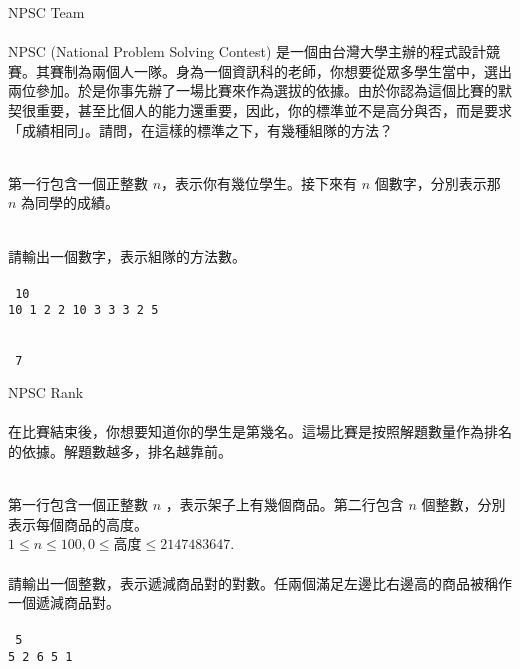 \documentclass{article}
\begin{document}

{\huge NPSC Team}\\

\\
    NPSC (National Problem Solving Contest) 是一個由台灣大學主辦的程式設計競賽。其賽制為兩個人一隊。身為一個資訊科的老師，你想要從眾多學生當中，選出兩位參加。於是你事先辦了一場比賽來作為選拔的依據。由於你認為這個比賽的默契很重要，甚至比個人的能力還重要，因此，你的標準並不是高分與否，而是要求「成績相同」。請問，在這樣的標準之下，有幾種組隊的方法？

\\
    第一行包含一個正整數 $n$，表示你有幾位學生。接下來有 $n$ 個數字，分別表示那 $n$ 為同學的成績。

\\
    請輸出一個數字，表示組隊的方法數。\\

\\
    \texttt{
        10\\
        10 1 2 2 10 3 3 3 2 5\\
    }


\\
    \texttt{
        7\\
    }

\newpage



{\huge NPSC Rank}\\

\\
    在比賽結束後，你想要知道你的學生是第幾名。這場比賽是按照解題數量作為排名的依據。解題數越多，排名越靠前。

\\
    第一行包含一個正整數 $n$ ，表示架子上有幾個商品。第二行包含 $n$ 個整數，分別表示每個商品的高度。\\
    \(1\leq n\leq 100, 0\leq\text{高度}\leq 2147483647\).\\

\\
    請輸出一個整數，表示遞減商品對的對數。任兩個滿足左邊比右邊高的商品被稱作一個遞減商品對。\\

\\
    \texttt{
        5\\
        5 2 6 5 1\\
    }
\end{document}
